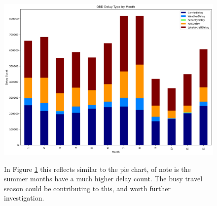 \documentclass[a4paper,12pt]{article}
\begin{document}
\begin{figure}
    \centering
    \includegraphics*[scale=.40]{../../img/ord_delay_t_month.png}
    \caption[]{}
    \label{fig:delaybymonth}
    In Figure \ref{fig:delaybymonth} this reflects similar to the pie chart, of note is the summer months have a much higher delay count. The busy travel season could be contributing to this, and worth further investigation.
\end{figure}
\end{document}
